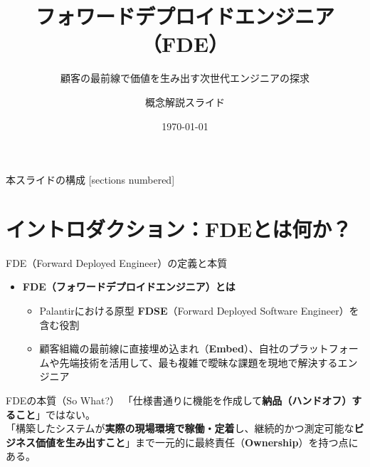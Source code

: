 \documentclass[aspectratio=169,11pt]{beamer}
\title{フォワードデプロイドエンジニア（FDE）}
\subtitle{顧客の最前線で価値を生み出す次世代エンジニアの探求}
\author{概念解説スライド}
\date{\today}
\institute{Forward Deployed Engineering Overview}
\begin{document}
\maketitle

\begin{frame}{本スライドの構成}
  [sections numbered]
  \tableofcontents[hideallsubsections]
\end{frame}

\section{イントロダクション：FDEとは何か？}

\begin{frame}{FDE（Forward Deployed Engineer）の定義と本質}
  \begin{itemize}
    \item \textbf{FDE（フォワードデプロイドエンジニア）とは}
      \begin{itemize}
        \item Palantirにおける原型 \textbf{FDSE}（Forward Deployed Software Engineer）を含む役割
        \item 顧客組織の最前線に直接埋め込まれ（\textbf{Embed}）、自社のプラットフォームや先端技術を活用して、最も複雑で曖昧な課題を現地で解決するエンジニア
      \end{itemize}
  \end{itemize}

  \vspace{0.6em}
  \begin{alertblock}{FDEの本質（So What?）}
    「仕様書通りに機能を作成して\textbf{納品（ハンドオフ）すること}」ではない。\\
    「構築したシステムが\textbf{実際の現場環境で稼働・定着}し、継続的かつ測定可能な\textbf{ビジネス価値を生み出すこと}」まで一元的に最終責任（\textbf{Ownership}）を持つ点にある。
  \end{alertblock}
\end{frame}
\end{document}
